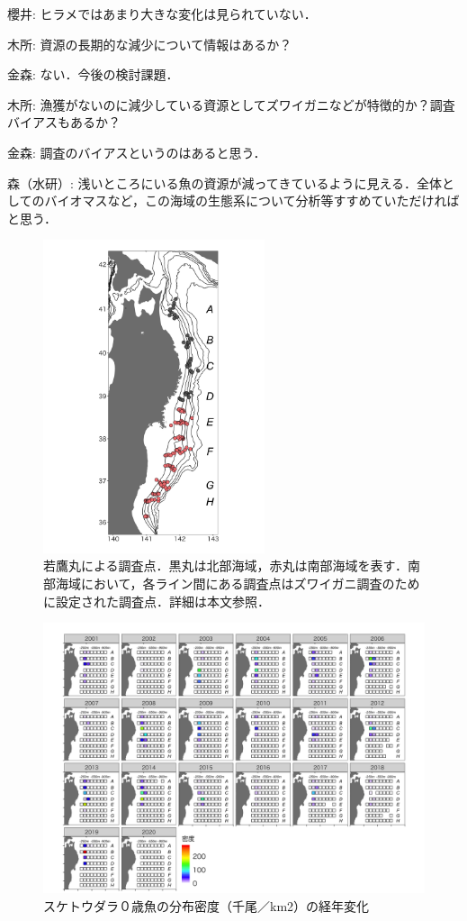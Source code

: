 \documentclass[11pt]{article} %
\begin{document}
\begin{linenumbers}
櫻井: ヒラメではあまり大きな変化は見られていない．

木所: 資源の長期的な減少について情報はあるか？  

金森: ない．今後の検討課題．

木所: 漁獲がないのに減少している資源としてズワイガニなどが特徴的か？調査バイアスもあるか？

金森: 調査のバイアスというのはあると思う．

森（水研）: 浅いところにいる魚の資源が減ってきているように見える．全体としてのバイオマスなど，この海域の生態系について分析等すすめていただければと思う．

\begin{figure}[h]
  \centering
  \includegraphics[width = 6.5cm]{fig1.png}
  \caption{若鷹丸による調査点．黒丸は北部海域，赤丸は南部海域を表す．南部海域において，各ライン間にある調査点はズワイガニ調査のために設定された調査点．詳細は本文参照．}
\end{figure}

\begin{figure}[h]
  \centering
  \includegraphics[width = 14cm]{スケトウダラ０＋dens.png}
  \caption{スケトウダラ０歳魚の分布密度（千尾／km2）の経年変化}
\end{figure}


\end{linenumbers}
\end{document}
